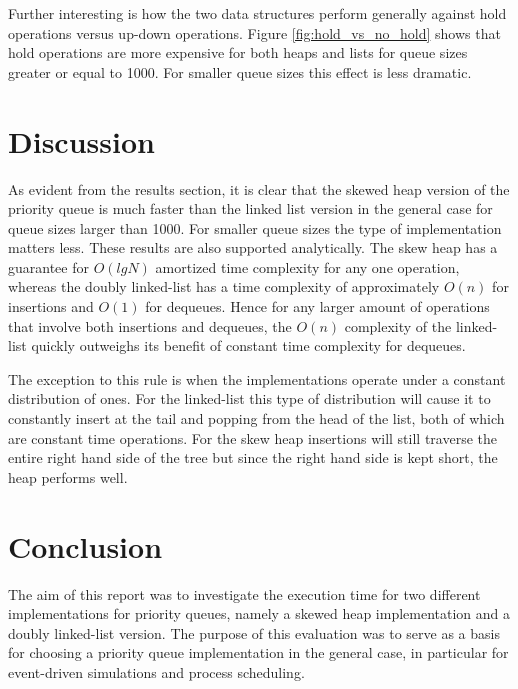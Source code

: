 \documentclass{article}
\begin{document}
Further interesting is how the two data structures perform generally against hold operations versus up-down operations. Figure \ref{fig:hold_vs_no_hold} shows that hold operations are more expensive for both heaps and lists for queue sizes greater or equal to 1000. For smaller queue sizes this effect is less dramatic.



\section{Discussion}
As evident from the results section, it is clear that the skewed heap version of the priority queue is much faster than the linked list version in the general case for queue sizes larger than 1000. For smaller queue sizes the type of implementation matters less. These results are also supported analytically. The skew heap has a guarantee for \(O(lg N)\) amortized time complexity for any one operation, whereas the doubly linked-list has a time complexity of approximately \(O(n)\) for insertions and \(O(1)\) for dequeues. Hence for any larger amount of operations that involve both insertions and dequeues, the \(O(n)\) complexity of the linked-list quickly outweighs its benefit of constant time complexity for dequeues.

The exception to this rule is when the implementations operate under a constant distribution of ones. For the linked-list this type of distribution will cause it to constantly insert at the tail and popping from the head of the list, both of which are constant time operations. For the skew heap insertions will still traverse the entire right hand side of the tree but since the right hand side is kept short, the heap performs well.



\section{Conclusion}
The aim of this report was to investigate the execution time for two different implementations for priority queues, namely a skewed heap implementation and a doubly linked-list version. The purpose of this evaluation was to serve as a basis for choosing a priority queue implementation in the general case, in particular for event-driven simulations and process scheduling.
\end{document}
